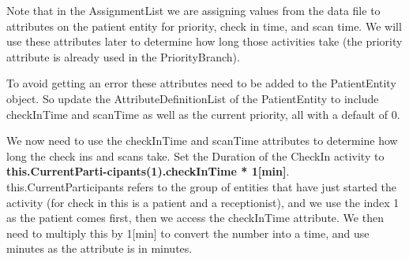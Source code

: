 \documentclass[
  10pt,
  a4paperpaper,
  DIV=11,
  numbers=noendperiod,
  oneside]{scrreprt}
\begin{document}
\begin{table}[H]

\caption{\label{tbl-pat_arr}Update PatientArrival}


\end{table}%

Note that in the AssignmentList we are assigning values from the data
file to attributes on the patient entity for priority, check in time,
and scan time. We will use these attributes later to determine how long
those activities take (the priority attribute is already used in the
PriorityBranch).

To avoid getting an error these attributes need to be added to the
PatientEntity object. So update the AttributeDefinitionList of the
PatientEntity to include checkInTime and scanTime as well as the current
priority, all with a default of 0.

We now need to use the checkInTime and scanTime attributes to determine
how long the check ins and scans take. Set the Duration of the CheckIn
activity to \textbf{this.CurrentParti-cipants(1).checkInTime *
1{[}min{]}}. this.CurrentParticipants refers to the group of entities
that have just started the activity (for check in this is a patient and
a receptionist), and we use the index 1 as the patient comes first, then
we access the checkInTime attribute. We then need to multiply this by
1{[}min{]} to convert the number into a time, and use minutes as the
attribute is in minutes.
\end{document}
